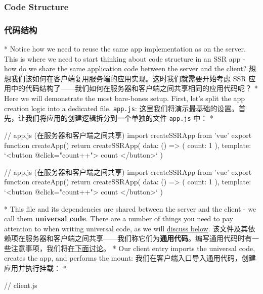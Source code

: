 \begin{paracol}{2}
\subsubsection{Code Structure}
\switchcolumn
\subsubsection{代码结构}
\switchcolumn[0]*%
Notice how we need to reuse the same app implementation as on the
server. This is where we need to start thinking about code structure in
an SSR app - how do we share the same application code between the
server and the client?
\switchcolumn
想想我们该如何在客户端复用服务端的应用实现。这时我们就需要开始考虑 SSR
应用中的代码结构了------我们如何在服务器和客户端之间共享相同的应用代码呢？
\switchcolumn[0]*%
Here we will demonstrate the most bare-bones setup. First, let's split
the app creation logic into a dedicated file, \texttt{app.js}:
\switchcolumn
这里我们将演示最基础的设置。首先，让我们将应用的创建逻辑拆分到一个单独的文件
\texttt{app.js} 中：
\switchcolumn[0]*%
\begin{codeJs}
// app.js (在服务器和客户端之间共享)
import { createSSRApp } from 'vue'
export function createApp() {
  return createSSRApp({
    data: () => ({ count: 1 }),
    template: `<button @click="count++">{{ count }}</button>`
  })
}
\end{codeJs}
\switchcolumn
\begin{codeJs}
// app.js (在服务器和客户端之间共享)
import { createSSRApp } from 'vue'
export function createApp() {
  return createSSRApp({
    data: () => ({ count: 1 }),
    template: `<button @click="count++">{{ count }}</button>`
  })
}
\end{codeJs}
\switchcolumn[0]*%
This file and its dependencies are shared between the server and the
client - we call them \textbf{universal code}. There are a number of
things you need to pay attention to when writing universal code, as we
will
\href{https://vuejs.org/guide/scaling-up/ssr.html\#writing-ssr-friendly-code}{discuss
below}.
\switchcolumn
该文件及其依赖项在服务器和客户端之间共享------我们称它们为\textbf{通用代码}。编写通用代码时有一些注意事项，我们将\href{https://cn.vuejs.org/guide/scaling-up/ssr.html\#writing-ssr-friendly-code}{在下面讨论}。
\switchcolumn[0]*%
Our client entry imports the universal code, creates the app, and
performs the mount:
\switchcolumn
我们在客户端入口导入通用代码，创建应用并执行挂载：
\switchcolumn[0]*%
\begin{codeJs}
// client.js

\end{codeJs}
\end{paracol}
